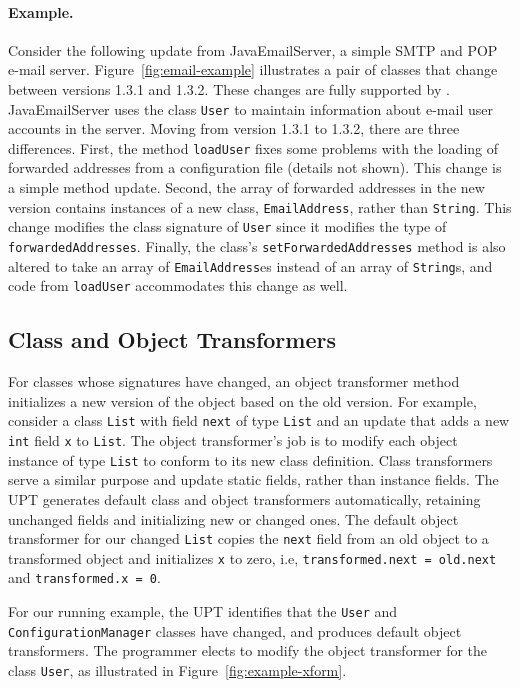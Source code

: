 \paragraph{Example.} 
Consider the following update from JavaEmailServer, a simple SMTP and
POP e-mail server.  Figure~\ref{fig:email-example}
illustrates a 
pair of classes that change between versions 1.3.1 and 1.3.2.  These
changes are fully supported by \DSU.  JavaEmailServer uses the class
{\tt User} to maintain information about e-mail user accounts in the
server.  Moving from version 1.3.1 to 1.3.2, there are three
differences.  First, the method {\tt loadUser} fixes some problems
with the loading of forwarded addresses from a configuration file
(details not shown).  This change is a simple method update.  Second,
the array of forwarded addresses in the new version contains instances of a new
class, {\tt EmailAddress}, rather than {\tt String}.  This change modifies
the class signature of {\tt User} since it modifies the type of
{\tt forwardedAddresses}.  Finally, the class's
{\tt setForwardedAddresses} method is also altered to take an array of
{\tt EmailAddress}es instead of an array of {\tt String}s, and
code from {\tt loadUser} accommodates this change as well.


\subsection{Class and Object Transformers}
\label{subsec:transformers}

For classes whose signatures have changed, an object transformer
method  initializes a new version of the object based on the
old version.  For example, consider a class \texttt{List} with field
\texttt{next} of type \texttt{List} and an update that adds a new
\texttt{int} field {\tt x} to \texttt{List}. The object transformer's
job is to modify each object instance of type \texttt{List} to conform
to its new class definition. Class transformers serve a similar
purpose and update static fields, rather than instance
fields.  The \ac{UPT} generates default class and object transformers
automatically, retaining unchanged fields and initializing new or
changed ones.  The default object transformer for our changed
\texttt{List} copies the \texttt{next} field from an old object to a
transformed object and initializes {\tt x} to zero, i.e,
\texttt{transformed.next = old.next} and \texttt{transformed.x = 0}.



For our running example, the \ac{UPT} identifies that
the {\tt User} and {\tt ConfigurationManager} classes have
changed, and produces default object transformers.  The programmer elects
to modify the object transformer for the class {\tt User}, as
illustrated in Figure~\ref{fig:example-xform}.

